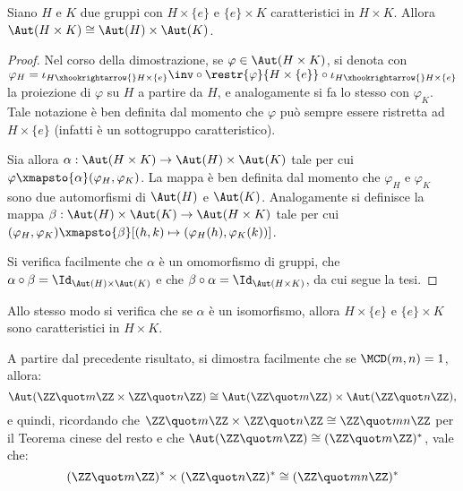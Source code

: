 \documentclass[12pt]{scrartcl}
\begin{document}
	\begin{proposition}
		Siano $H$ e $K$ due gruppi con $H \times \{e\}$ e $\{e\} \times K$ caratteristici
		in $H \times K$. Allora $\Aut(H \times K) \cong \Aut(H) \times \Aut(K)$.
	\end{proposition}
	
	\begin{proof}
		Nel corso della dimostrazione, se $\varphi \in \Aut(H \times K)$, si
		denota con $\varphi_H = \iota_{H \xhookrightarrow{} H \times \{e\}}\inv \circ \restr{\varphi}{H \times \{e\}} \circ \iota_{H \xhookrightarrow{} H \times \{e\}}$ la proiezione di $\varphi$ su
		$H$ a partire da $H$, e analogamente si fa lo stesso con $\varphi_K$. Tale
		notazione è ben definita dal momento che $\varphi$ può sempre essere ristretta
		ad $H \times \{e\}$ (infatti è un sottogruppo caratteristico). \medskip
		
		
		Sia allora
		$\alpha : \Aut(H \times K) \to \Aut(H) \times \Aut(K)$ tale per cui
		$\varphi \xmapsto{\alpha} (\varphi_H, \varphi_K)$. La mappa è ben
		definita dal momento che $\varphi_H$ e $\varphi_K$ sono due automorfismi
		di $\Aut(H)$ e $\Aut(K)$. Analogamente si definisce la mappa
		$\beta : \Aut(H) \times \Aut(K) \to \Aut(H \times K)$ tale per cui
		$(\varphi_H, \varphi_K) \xmapsto{\beta} [(h, k) \mapsto (\varphi_H(h), \varphi_K(k))]$.
		\medskip
		
		
		Si verifica facilmente che $\alpha$ è un omomorfismo di gruppi, che
		$\alpha \circ \beta = \Id_{\Aut(H) \times \Aut(K)}$ e che
		$\beta \circ \alpha = \Id_{\Aut(H \times K)}$, da cui segue la tesi.
	\end{proof}
	
	
	Allo stesso modo si verifica che se $\alpha$ è un isomorfismo, allora
	$H \times \{e\}$ e $\{e\} \times K$ sono caratteristici in $H \times K$. \medskip
	
	
	A partire dal precedente risultato, si dimostra facilmente che se $\MCD(m, n) = 1$,
	allora:
	\[ \Aut(\ZZ \quot m \ZZ \times \ZZ \quot n \ZZ) \cong \Aut(\ZZ \quot m \ZZ) \times \Aut(\ZZ \quot n \ZZ), \]
	e quindi, ricordando che $\ZZ \quot m \ZZ \times \ZZ \quot n \ZZ \cong \ZZ \quot mn \ZZ$
	per il Teorema cinese del resto e che $\Aut(\ZZ \quot m \ZZ) \cong (\ZZ \quot m \ZZ)^*$,
	vale che:
	\[ (\ZZ \quot m \ZZ)^* \times (\ZZ \quot n \ZZ)^* \cong (\ZZ \quot mn \ZZ)^* \]
\end{document}
